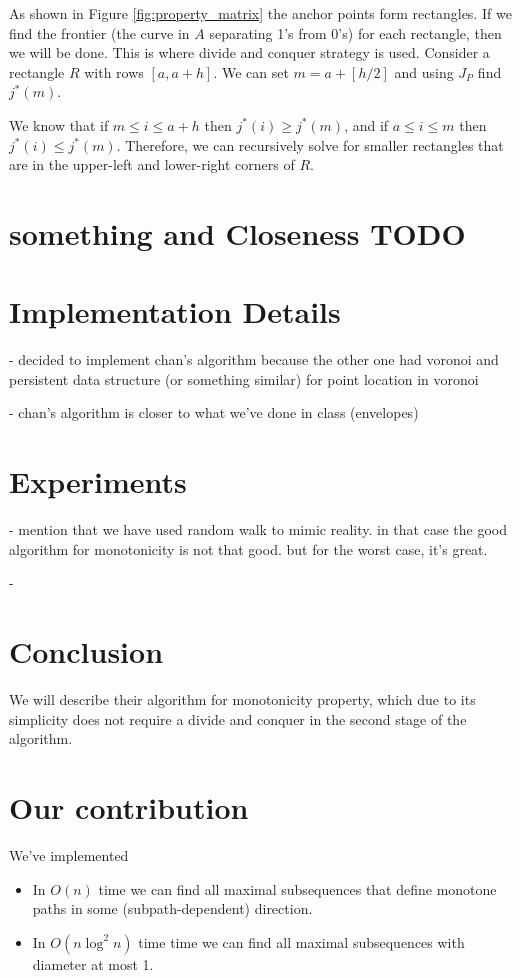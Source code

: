 \documentclass{article}
\begin{document}
As shown in Figure \ref{fig:property_matrix} the anchor points form rectangles. If we find the frontier (the curve in $A$ separating 1's from 0's) for each rectangle, then we will be done. This is where divide and conquer strategy is used. Consider a rectangle $R$ with rows $[a, a + h]$. We can set $m = a + [h / 2]$ and using $J_P$ find $j^*(m)$.

We know that if $m \leq i \leq a + h$ then $j^*(i) \geq j^*(m)$, and if $a \leq i \leq m$ then $j^*(i) \leq j^*(m)$. Therefore, we can recursively solve for smaller rectangles that are in the upper-left and lower-right corners of $R$.

\section{something and Closeness TODO}
\label{sec:closeness}

\section{Implementation Details}
\label{sec:implementation}
- decided to implement chan's algorithm because the other one had voronoi and persistent data structure (or something similar) for point location in voronoi

- chan's algorithm is closer to what we've done in class (envelopes)

\section{Experiments}
\label{sec:experiments}
- mention that we have used random walk to mimic reality. in that case the good algorithm for monotonicity is not that good. but for the worst case, it's great.

- 

\section{Conclusion}
\label{sec:conclusion}

We will describe their algorithm for monotonicity property, which due to its simplicity does not require a divide and conquer in the second stage of the algorithm.

\section{Our contribution}
We've implemented
\begin{itemize}
\item In $O(n)$ time  we  can  find  all  maximal  subsequences  that  define  monotone  paths  in  some (subpath-dependent) direction. \cite{bokal_et_al:LIPIcs:2015:5113} 
\item In $O(n \log^2 n)$ time time we can find all maximal subsequences with diameter at most 1. \cite{chan_et_al:LIPIcs:2016:5920}
\end{itemize}
\end{document}

